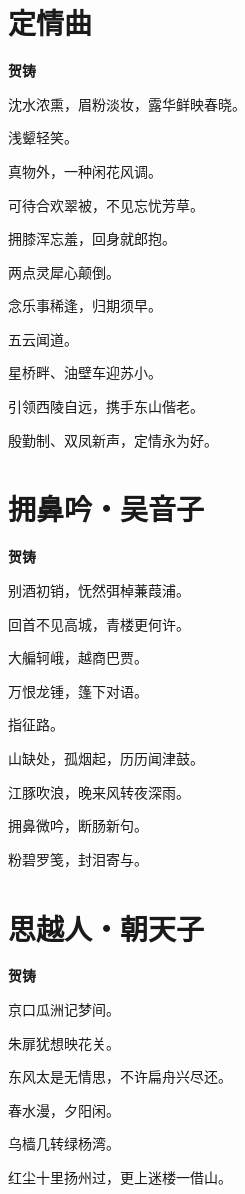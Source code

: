 \documentclass[12pt,a4paper]{ctexbook}
\begin{document}
\section{定情曲}
\textbf{贺铸}\par\vspace{0.5em}
沈水浓熏，眉粉淡妆，露华鲜映春晓。\par
浅颦轻笑。\par
真物外，一种闲花风调。\par
可待合欢翠被，不见忘忧芳草。\par
拥膝浑忘羞，回身就郎抱。\par
两点灵犀心颠倒。\par
念乐事稀逢，归期须早。\par
五云闻道。\par
星桥畔、油壁车迎苏小。\par
引领西陵自远，携手东山偕老。\par
殷勤制、双凤新声，定情永为好。\par

\section{拥鼻吟・吴音子}
\textbf{贺铸}\par\vspace{0.5em}
别酒初销，怃然弭棹蒹葭浦。\par
回首不见高城，青楼更何许。\par
大艑轲峨，越商巴贾。\par
万恨龙锺，篷下对语。\par
指征路。\par
山缺处，孤烟起，历历闻津鼓。\par
江豚吹浪，晚来风转夜深雨。\par
拥鼻微吟，断肠新句。\par
粉碧罗笺，封泪寄与。\par

\section{思越人・朝天子}
\textbf{贺铸}\par\vspace{0.5em}
京口瓜洲记梦间。\par
朱扉犹想映花关。\par
东风太是无情思，不许扁舟兴尽还。\par
春水漫，夕阳闲。\par
乌樯几转绿杨湾。\par
红尘十里扬州过，更上迷楼一借山。\par
\end{document}
